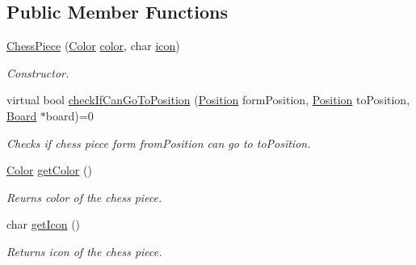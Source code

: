 \subsection*{Public Member Functions}
\begin{DoxyCompactItemize}
\item 
\hyperlink{classChessPiece_a38c44e06d7bf1b0f96d27886ca5d389f}{Chess\+Piece} (\hyperlink{Enums_8h_ab87bacfdad76e61b9412d7124be44c1c}{Color} \hyperlink{classChessPiece_a8c8fc170e7c719ac2b71a93a56a38f01}{color}, char \hyperlink{classChessPiece_ad32540487648131ed69e63f46f787d08}{icon})
\begin{DoxyCompactList}\small\item\em Constructor. \end{DoxyCompactList}\item 
virtual bool \hyperlink{classChessPiece_a90119a7c3c74ed9f967c398b8a7d7a98}{check\+If\+Can\+Go\+To\+Position} (\hyperlink{classPosition}{Position} form\+Position, \hyperlink{classPosition}{Position} to\+Position, \hyperlink{classBoard}{Board} $\ast$board)=0
\begin{DoxyCompactList}\small\item\em Checks if chess piece form from\+Position can go to to\+Position. \end{DoxyCompactList}\item 
\hyperlink{Enums_8h_ab87bacfdad76e61b9412d7124be44c1c}{Color} \hyperlink{classChessPiece_a99f599eac60792290e3bcb3bea1e0970}{get\+Color} ()
\begin{DoxyCompactList}\small\item\em Reurns color of the chess piece. \end{DoxyCompactList}\item 
char \hyperlink{classChessPiece_aee72609f866105f5676e007887877b7c}{get\+Icon} ()
\begin{DoxyCompactList}\small\item\em Returns icon of the chess piece. \end{DoxyCompactList}\end{DoxyCompactItemize}
